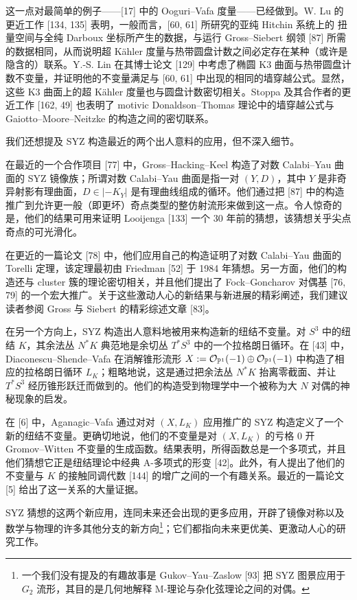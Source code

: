 这一点对最简单的例子------[17] 中的 Ooguri--Vafa 度量------已经做到。W. Lu 的更近工作 [134, 135] 表明，一般而言，[60, 61] 所研究的亚纯 Hitchin 系统上的 扭量空间与全纯 Darboux 坐标所产生的数据，与运行 Gross--Siebert 纲领 [87] 所需的数据相同，从而说明超 Kähler 度量与热带圆盘计数之间必定存在某种（或许是隐含的）联系。Y.-S. Lin 在其博士论文 [129] 中考虑了椭圆 K3 曲面与热带圆盘计数不变量，并证明他的不变量满足与 [60, 61] 中出现的相同的墙穿越公式。显然，这些 K3 曲面上的超 Kähler 度量也与圆盘计数密切相关。Stoppa 及其合作者的更近工作 [162, 49] 也表明了 motivic Donaldson--Thomas 理论中的墙穿越公式与 Gaiotto--Moore--Neitzke 的构造之间的密切联系。

我们还想提及 SYZ 构造最近的两个出人意料的应用，但不深入细节。

在最近的一个合作项目 [77] 中，Gross--Hacking--Keel 构造了对数 Calabi--Yau 曲面的 SYZ 镜像族；所谓对数 Calabi--Yau 曲面是指一对 $(Y,D)$，其中 $Y$ 是非奇异射影有理曲面，$D\in|-K_Y|$ 是有理曲线组成的循环。他们通过把 [87] 中的构造推广到允许更一般（即更坏）奇点类型的整仿射流形来做到这一点。令人惊奇的是，他们的结果可用来证明 Looijenga [133] 一个 30 年前的猜想，该猜想关乎尖点奇点的可光滑化。

在更近的一篇论文 [78] 中，他们应用自己的构造证明了对数 Calabi--Yau 曲面的 Torelli 定理，该定理最初由 Friedman [52] 于 1984 年猜想。另一方面，他们的构造还与 cluster 簇的理论密切相关，并且他们提出了 Fock--Goncharov 对偶基 [76, 79] 的一个宏大推广。关于这些激动人心的新结果与新进展的精彩阐述，我们建议读者参阅 Gross 与 Siebert 的精彩综述文章 [83]。

在另一个方向上，SYZ 构造出人意料地被用来构造新的纽结不变量。对 $S^3$ 中的纽结 $K$，其余法丛 $N^*K$ 典范地是余切丛 $T^*S^3$ 中的一个拉格朗日循环。在 [43] 中，Diaconescu--Shende--Vafa 在消解锥形流形 $X:=\mathcal{O}_{\mathbb{P}^1}(-1)\oplus\mathcal{O}_{\mathbb{P}^1}(-1)$ 中构造了相应的拉格朗日循环 $L_K$；粗略地说，这是通过把余法丛 $N^*K$ 抬离零截面、并让 $T^*S^3$ 经历锥形跃迁而做到的。他们的构造受到物理学中一个被称为大 $N$ 对偶的神秘现象的启发。

在 [6] 中，Aganagic--Vafa 通过对对 $(X,L_K)$ 应用推广的 SYZ 构造定义了一个新的纽结不变量。更确切地说，他们的不变量是对 $(X,L_K)$ 的亏格 0 开 Gromov--Witten 不变量的生成函数。结果表明，所得函数总是一个多项式，并且他们猜想它正是纽结理论中经典 A-多项式的形变 [42]。此外，有人提出了他们的不变量与 $K$ 的接触同调代数 [144] 的增广之间的一个有趣关系。最近的一篇论文 [5] 给出了这一关系的大量证据。

SYZ 猜想的这两个新应用，连同未来还会出现的更多应用，开辟了镜像对称以及数学与物理的许多其他分支的新方向\footnote{一个我们没有提及的有趣故事是 Gukov--Yau--Zaslow [93] 把 SYZ 图景应用于 $G_2$ 流形，其目的是几何地解释 M-理论与杂化弦理论之间的对偶。}；它们都指向未来更优美、更激动人心的研究工作。
